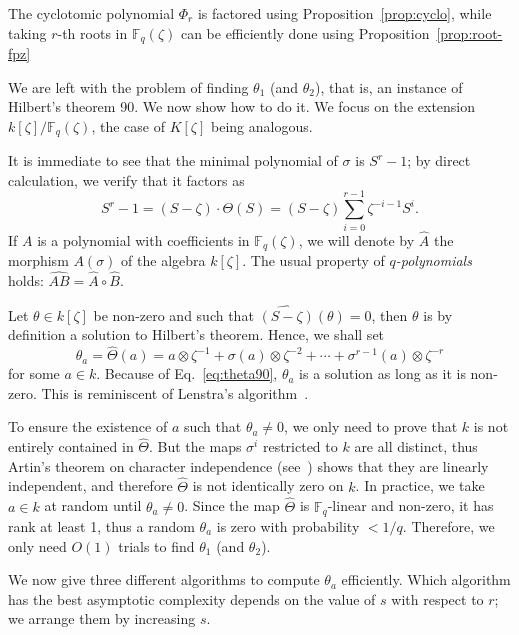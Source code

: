 \documentclass[12pt]{article}
\theoremstyle{plain}
\theoremstyle{definition}
\def\F{\ensuremath{\mathbb{F}}}
\newcounter{algorithm}
\begin{document}
The cyclotomic polynomial $\Phi_r$ is factored using Proposition~\ref{prop:cyclo}, while
taking $r$-th roots in $\F_q(\zeta)$ can be efficiently done using 
Proposition~\ref{prop:root-fpz}

We are left with the problem of finding $\theta_1$ (and $\theta_2$), that is, an instance of Hilbert's theorem 90.
We now show how to do it.
We focus on the extension $k[\zeta]/\F_q(\zeta)$, the case of
$K[\zeta]$ being analogous.

It is immediate to see that the minimal polynomial of $\sigma$ is
$S^r-1$; by direct calculation, we verify that it factors as
\begin{equation}
  \label{eq:theta90}
  S^r-1 = (S-\zeta)\cdot\Theta(S) =
  (S-\zeta)\sum_{i=0}^{r-1} \zeta^{-i-1}S^i. 
\end{equation}
If $A$ is a polynomial with coefficients in $\F_q(\zeta)$, we will
denote by $\hat{A}$ the morphism $A(\sigma)$ of the algebra
$k[\zeta]$. %
The usual property of \emph{$q$-polynomials} holds:
$\widehat{AB} = \hat{A}\circ\hat{B}$.

Let $\theta\in k[\zeta]$ be  non-zero and such that $\widehat{(S-\zeta)}(\theta)=0$,
then $\theta$ is by definition a solution to Hilbert's
theorem. %
Hence, we shall set
\begin{equation}
  \theta_a = \hat\Theta(a)
  =  a\otimes\zeta^{-1} + \sigma(a)\otimes\zeta^{-2} + \cdots + \sigma^{r-1}(a)\otimes\zeta^{-r}
\end{equation}
for some $a\in k$. %
Because of Eq.~\eqref{eq:theta90}, $\theta_a$ is a solution as long as
it is non-zero. %
This is reminiscent of Lenstra's algorithm~\cite[Th.~5.2]{LenstraJr91}.

To ensure the existence of $a$ such that $\theta_a\ne0$, we only need
to prove that $k$ is not entirely contained in $\hat\Theta$. %
But the maps $\sigma^i$ restricted to $k$ are all distinct, thus
Artin's theorem on character independence (see~\cite[Ch~VI, Theorem~4.1]{lang})
shows that they are linearly 
independent, and therefore $\hat\Theta$ is not identically zero on $k$.
In practice, we take $a \in k$ at random until
$\theta_a\ne0$. Since the map $\hat\Theta$ is
$\F_q$-linear and non-zero, it has rank at least 1, thus a
random $\theta_a$ is zero with probability $< 1 / q$. Therefore, we only 
need $O(1)$ trials to find $\theta_1$ (and $\theta_2$).

We now give three different algorithms to compute $\theta_a$ efficiently.
Which algorithm has the best asymptotic complexity depends on the
value of $s$ with respect to $r$; we arrange them by increasing $s$.
\end{document}
